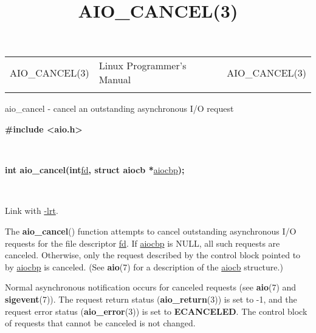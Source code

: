 \documentclass[]{article}
\title{AIO\_CANCEL(3)}
\author{}
\date{}
\let\realtextbf=\textbf
\renewcommand{\textbf}[1]{\textcolor{boldcolor}{\realtextbf{#1}}}
\renewcommand{\emph}[1]{\underline{#1}}
\begin{document}
\maketitle

\begin{longtable}[c]{@{}lll@{}}
\toprule\addlinespace
AIO\_CANCEL(3) & Linux Programmer's Manual & AIO\_CANCEL(3)
\\\addlinespace
\bottomrule
\end{longtable}


aio\_cancel - cancel an outstanding asynchronous I/O request


\textbf{\#include \textless{}aio.h\textgreater{}}

~

\textbf{int aio\_cancel(int}\emph{fd}\textbf{, struct aiocb
*}\emph{aiocbp}\textbf{);}

~

Link with \emph{-lrt}.


The \textbf{aio\_cancel}() function attempts to cancel outstanding
asynchronous I/O requests for the file descriptor \emph{fd}. If
\emph{aiocbp} is NULL, all such requests are canceled. Otherwise, only
the request described by the control block pointed to by \emph{aiocbp}
is canceled. (See \textbf{aio}(7) for a description of the \emph{aiocb}
structure.)

Normal asynchronous notification occurs for canceled requests (see
\textbf{aio}(7) and \textbf{sigevent}(7)). The request return status
(\textbf{aio\_return}(3)) is set to -1, and the request error status
(\textbf{aio\_error}(3)) is set to \textbf{ECANCELED}. The control block
of requests that cannot be canceled is not changed.
\end{document}

